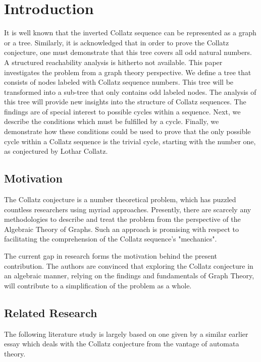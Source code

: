 \chapter{Introduction}

\begin{summary}
It is well known that the inverted Collatz sequence can be represented as a graph or a tree. Similarly, it is acknowledged that in order to prove the Collatz conjecture, one must demonstrate that this tree covers all odd natural numbers. A structured reachability analysis is hitherto not available. This paper investigates the problem from a graph theory perspective. We define a tree that consists of nodes labeled with Collatz sequence numbers. This tree will be transformed into a sub-tree that only contains odd labeled nodes. The analysis of this tree will provide new insights into the structure of Collatz sequences. The findings are of special interest to possible cycles within a sequence. Next, we describe the conditions which must be fulfilled by a cycle. Finally, we demonstrate how these conditions could be used to prove that the only possible cycle within a Collatz sequence is the trivial cycle, starting with the number one, as conjectured by Lothar Collatz.
\end{summary}

\section{Motivation}
The Collatz conjecture is a number theoretical problem, which has puzzled countless researchers using myriad approaches. Presently, there are scarcely any methodologies to describe and treat the problem from the perspective of the Algebraic Theory of Graphs. Such an approach is promising with respect to facilitating the comprehension of the Collatz sequence’s "mechanics".

\par\medskip
The current gap in research forms the motivation behind the present contribution. The authors are convinced that exploring the Collatz conjecture in an algebraic manner, relying on the ﬁndings and fundamentals of Graph Theory, will contribute to a simplification of the problem as a whole.

\section{Related Research}
The following literature study is largely based on one given by a similar earlier essay \cite{Ref_Sultanow_Volkov_Cox_2017} which deals with the Collatz conjecture from the vantage of automata theory.

